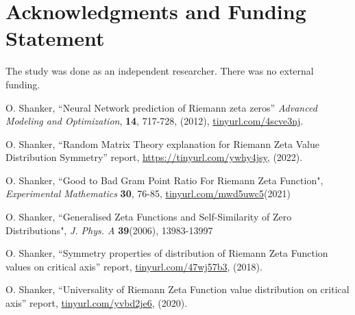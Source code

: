 \documentclass[twoside]{article}
\begin{document}
\section*{Acknowledgments and Funding Statement}

 The study was done as an independent researcher. There was no
external funding.




\begin{thebibliography}{10}

 O. Shanker, ``Neural Network prediction of Riemann zeta zeros''
{\it Advanced Modeling and Optimization}, {\bf 14}, 717-728, (2012), \url{tinyurl.com/4scve3nj}.


 O. Shanker, 
``Random Matrix Theory explanation for Riemann Zeta Value Distribution Symmetry''
 report,
\url{https://tinyurl.com/ywhy4jsy}, 
(2022). 


 O. Shanker, 
``Good to Bad Gram Point Ratio For Riemann Zeta Function",
{\it Experimental Mathematics} {\bf 30}, 76-85,
\url{tinyurl.com/mwd5uwc5}(2021)

 O. Shanker, 
``Generalised Zeta Functions and Self-Similarity of Zero Distributions",
{\it J.  Phys. A} {\bf39}(2006), 13983-13997

 O. Shanker, 
``Symmetry properties of distribution of Riemann Zeta Function values on critical axis''
 report,
\url{tinyurl.com/47wj57b3}, 
(2018). 

 O. Shanker, 
``Universality of Riemann Zeta Function value distribution on critical axis''
 report,
\url{tinyurl.com/yvbd2je6}, 
(2020). 




\end{thebibliography} 
\end{document}
